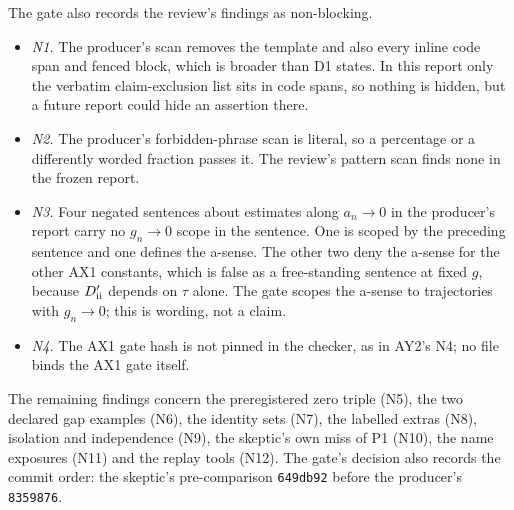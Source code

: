 The gate also records the review's findings as non-blocking.
\begin{itemize}
\item \emph{N1.} The producer's scan removes the template and also every
 inline code span and fenced block, which is broader than D1 states. In this
 report only the verbatim claim-exclusion list sits in code spans, so
 nothing is hidden, but a future report could hide an assertion there.
\item \emph{N2.} The producer's forbidden-phrase scan is literal, so a
 percentage or a differently worded fraction passes it. The review's pattern
 scan finds none in the frozen report.
\item \emph{N3.} Four negated sentences about estimates along $a_n\to0$ in
 the producer's report carry no $g_n\to0$ scope in the sentence. One is
 scoped by the preceding sentence and one defines the a-sense. The other two
 deny the a-sense for the other AX1 constants, which is false as a
 free-standing sentence at fixed $g$, because $D'_{\rm ii}$ depends on $\tau$
 alone. The gate scopes the a-sense to trajectories with $g_n\to0$; this is
 wording, not a claim.
\item \emph{N4.} The AX1 gate hash is not pinned in the checker, as in AY2's
 N4; no file binds the AX1 gate itself.
\end{itemize}
The remaining findings concern the preregistered zero triple (N5), the two
declared gap examples (N6), the identity sets (N7), the labelled extras (N8),
isolation and independence (N9), the skeptic's own miss of P1 (N10), the name
exposures (N11) and the replay tools (N12). The gate's decision also records
the commit order: the skeptic's pre-comparison \texttt{649db92} before the
producer's \texttt{8359876}.

